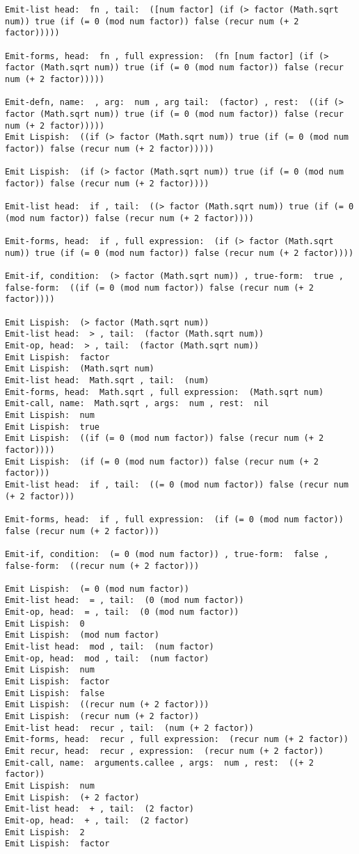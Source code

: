 \begin{verbatim}
Emit-list head:  fn , tail:  ([num factor] (if (> factor (Math.sqrt num)) true (if (= 0 (mod num factor)) false (recur num (+ 2 factor)))))

Emit-forms, head:  fn , full expression:  (fn [num factor] (if (> factor (Math.sqrt num)) true (if (= 0 (mod num factor)) false (recur num (+ 2 factor)))))

Emit-defn, name:  , arg:  num , arg tail:  (factor) , rest:  ((if (> factor (Math.sqrt num)) true (if (= 0 (mod num factor)) false (recur num (+ 2 factor)))))
Emit Lispish:  ((if (> factor (Math.sqrt num)) true (if (= 0 (mod num factor)) false (recur num (+ 2 factor)))))

Emit Lispish:  (if (> factor (Math.sqrt num)) true (if (= 0 (mod num factor)) false (recur num (+ 2 factor))))

Emit-list head:  if , tail:  ((> factor (Math.sqrt num)) true (if (= 0 (mod num factor)) false (recur num (+ 2 factor))))

Emit-forms, head:  if , full expression:  (if (> factor (Math.sqrt num)) true (if (= 0 (mod num factor)) false (recur num (+ 2 factor))))

Emit-if, condition:  (> factor (Math.sqrt num)) , true-form:  true , false-form:  ((if (= 0 (mod num factor)) false (recur num (+ 2 factor))))

Emit Lispish:  (> factor (Math.sqrt num))
Emit-list head:  > , tail:  (factor (Math.sqrt num))
Emit-op, head:  > , tail:  (factor (Math.sqrt num))
Emit Lispish:  factor
Emit Lispish:  (Math.sqrt num)
Emit-list head:  Math.sqrt , tail:  (num)
Emit-forms, head:  Math.sqrt , full expression:  (Math.sqrt num)
Emit-call, name:  Math.sqrt , args:  num , rest:  nil
Emit Lispish:  num
Emit Lispish:  true
Emit Lispish:  ((if (= 0 (mod num factor)) false (recur num (+ 2 factor))))
Emit Lispish:  (if (= 0 (mod num factor)) false (recur num (+ 2 factor)))
Emit-list head:  if , tail:  ((= 0 (mod num factor)) false (recur num (+ 2 factor)))

Emit-forms, head:  if , full expression:  (if (= 0 (mod num factor)) false (recur num (+ 2 factor)))

Emit-if, condition:  (= 0 (mod num factor)) , true-form:  false , false-form:  ((recur num (+ 2 factor)))

Emit Lispish:  (= 0 (mod num factor))
Emit-list head:  = , tail:  (0 (mod num factor))
Emit-op, head:  = , tail:  (0 (mod num factor))
Emit Lispish:  0
Emit Lispish:  (mod num factor)
Emit-list head:  mod , tail:  (num factor)
Emit-op, head:  mod , tail:  (num factor)
Emit Lispish:  num
Emit Lispish:  factor
Emit Lispish:  false
Emit Lispish:  ((recur num (+ 2 factor)))
Emit Lispish:  (recur num (+ 2 factor))
Emit-list head:  recur , tail:  (num (+ 2 factor))
Emit-forms, head:  recur , full expression:  (recur num (+ 2 factor))
Emit recur, head:  recur , expression:  (recur num (+ 2 factor))
Emit-call, name:  arguments.callee , args:  num , rest:  ((+ 2 factor))
Emit Lispish:  num
Emit Lispish:  (+ 2 factor)
Emit-list head:  + , tail:  (2 factor)
Emit-op, head:  + , tail:  (2 factor)
Emit Lispish:  2
Emit Lispish:  factor


\end{verbatim}
